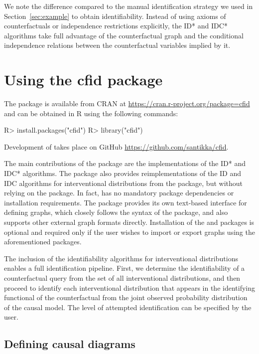 We note the difference compared to the manual identification strategy we used in Section~\ref{sec:example} to obtain identifiability. Instead of using axioms of counterfactuals or independence restrictions explicitly, the ID* and IDC* algorithms take full advantage of the counterfactual graph and the conditional independence relations between the counterfactual variables implied by it.

\section{Using the cfid package} \label{sec:package}

The  package is available from CRAN at \url{https://cran.r-project.org/package=cfid} and can be obtained in R using the following commands:
\begin{example}
R> install.packages("cfid")
R> library("cfid")
\end{example}
Development of  takes place on GitHub \url{https://github.com/santikka/cfid}.

The main contributions of the  package are the implementations of the ID* and IDC* algorithms. The package also provides reimplementations of the ID and IDC algorithms for interventional distributions from the  package, but without relying on the  \citep{igraph} package. In fact,  has no mandatory package dependencies or installation requirements. The  package provides its own text-based interface for defining graphs, which closely follows the syntax of the  package, and also supports other external graph formats directly. Installation of the  and  packages is optional and required only if the user wishes to import or export graphs using the aforementioned packages.

The inclusion of the identifiability algorithms for interventional distributions enables a full identification pipeline. First, we determine the identifiability of a counterfactual query from the set of all interventional distributions, and then proceed to identify each interventional distribution that appears in the identifying functional of the counterfactual from the joint observed probability distribution of the causal model. The level of attempted identification can be specified by the user.

\subsection{Defining causal diagrams} \label{sec:graphs}


